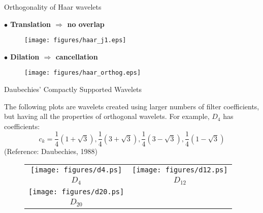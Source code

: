 \documentclass{beamer}
\begin{document}
\begin{frame}{Orthogonality of Haar wavelets}

{\bf $\bullet$ Translation $\Rightarrow$ no overlap}
\begin{centering}
\begin{figure}[ht]
\texttt{[image: figures/haar\_j1.eps]} \\
\end{figure}
\end{centering}

{\bf $\bullet$ Dilation $\Rightarrow$ cancellation}
\begin{centering}
\begin{figure}[ht]
\texttt{[image: figures/haar\_orthog.eps]} \\
\end{figure}
\end{centering}

\end{frame} 


\begin{frame}{Daubechies' Compactly Supported Wavelets}

The following plots are wavelets created using larger numbers of filter
coefficients, but having all the properties of orthogonal wavelets. For example,
$D_4$ has coefficients:
\[ c_k = \frac{1}{4}(1+\sqrt{3}), \frac{1}{4} (3 + \sqrt{3}) , \frac{1}{4} (3 - \sqrt{3}), \frac{1}{4}(1 - \sqrt{3})\]
(Reference: Daubechies, 1988)
\begin{centering}
\begin{figure}[ht]
\begin{tabular}{cc}
\texttt{[image: figures/d4.ps]} & 
\texttt{[image: figures/d12.ps]} \\
{\bf $D_4$} & {\bf $D_{12}$}\\
\texttt{[image: figures/d20.ps]} \\ 
{\bf $D_{20}$} \\
\end{tabular}
\end{figure}
\end{centering}

\end{frame} 

\end{document}
